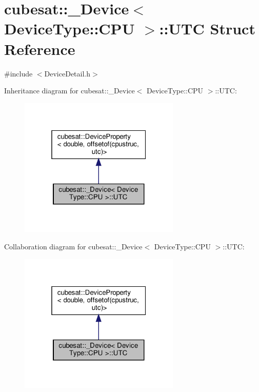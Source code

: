 \hypertarget{structcubesat_1_1__Device_3_01DeviceType_1_1CPU_01_4_1_1UTC}{}\section{cubesat\+:\+:\+\_\+\+Device$<$ Device\+Type\+:\+:C\+PU $>$\+:\+:U\+TC Struct Reference}
\label{structcubesat_1_1__Device_3_01DeviceType_1_1CPU_01_4_1_1UTC}


{\ttfamily \#include $<$Device\+Detail.\+h$>$}



Inheritance diagram for cubesat\+:\+:\+\_\+\+Device$<$ Device\+Type\+:\+:C\+PU $>$\+:\+:U\+TC\+:\nopagebreak
\begin{figure}[H]
\begin{center}
\leavevmode
\includegraphics[width=217pt]{structcubesat_1_1__Device_3_01DeviceType_1_1CPU_01_4_1_1UTC__inherit__graph}
\end{center}
\end{figure}


Collaboration diagram for cubesat\+:\+:\+\_\+\+Device$<$ Device\+Type\+:\+:C\+PU $>$\+:\+:U\+TC\+:\nopagebreak
\begin{figure}[H]
\begin{center}
\leavevmode
\includegraphics[width=217pt]{structcubesat_1_1__Device_3_01DeviceType_1_1CPU_01_4_1_1UTC__coll__graph}
\end{center}
\end{figure}
